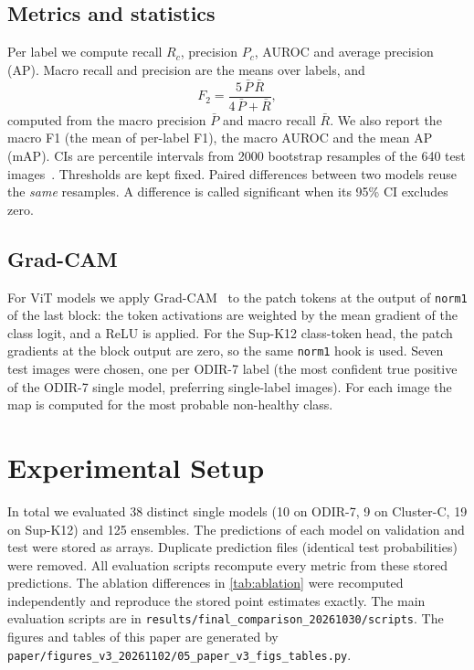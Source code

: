 ﻿\documentclass[conference]{IEEEtran}
\begin{document}
\subsection{Metrics and statistics}
Per label we compute recall $R_c$, precision $P_c$, AUROC and average precision (AP). Macro recall and precision are the means over labels, and
\begin{equation}
F_2 = \frac{5\,\bar P\,\bar R}{4\,\bar P+\bar R},
\end{equation}
computed from the macro precision $\bar P$ and macro recall $\bar R$. We also report the macro F1 (the mean of per-label F1), the macro AUROC and the mean AP (mAP).
CIs are percentile intervals from 2000 bootstrap resamples of the 640 test images~\cite{efron1993bootstrap}. Thresholds are kept fixed.
Paired differences between two models reuse the \emph{same} resamples. A difference is called significant when its 95\% CI excludes zero.

\subsection{Grad-CAM}\label{sec:gradcam}
For ViT models we apply Grad-CAM~\cite{selvaraju2017gradcam} to the patch tokens at the output of \texttt{norm1} of the last block: the token activations are weighted by the mean gradient of the class logit, and a ReLU is applied.
For the Sup-K12 class-token head, the patch gradients at the block output are zero, so the same \texttt{norm1} hook is used.
Seven test images were chosen, one per ODIR-7 label (the most confident true positive of the ODIR-7 single model, preferring single-label images). For each image the map is computed for the most probable non-healthy class.

\section{Experimental Setup}
In total we evaluated 38 distinct single models (10 on ODIR-7, 9 on Cluster-C, 19 on Sup-K12) and 125 ensembles. The predictions of each model on validation and test were stored as arrays. Duplicate prediction files (identical test probabilities) were removed.
All evaluation scripts recompute every metric from these stored predictions. The ablation differences in \autoref{tab:ablation} were recomputed independently and reproduce the stored point estimates exactly.
The main evaluation scripts are in \texttt{results/final\_comparison\_20261030/scripts}. The figures and tables of this paper are generated by \texttt{paper/figures\_v3\_20261102/05\_paper\_v3\_figs\_tables.py}.
\end{document}

